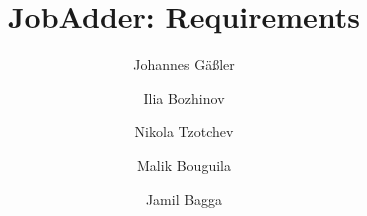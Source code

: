 \documentclass[a4paper,10pt]{scrreprt}
\title{JobAdder: Requirements}
\author{Johannes Gäßler \and  Ilia Bozhinov \and Nikola Tzotchev \and Malik Bouguila \and Jamil Bagga}
\begin{document}
\maketitle
\tableofcontents
\newpage









\newpage



\printunsrtglossaries
\end{document}
